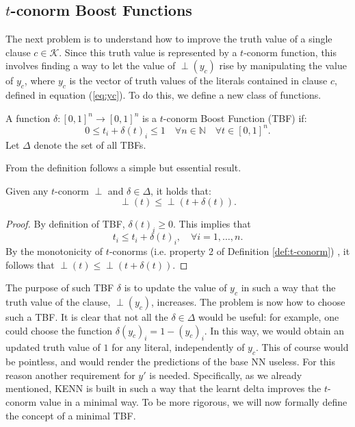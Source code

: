\subsection{$t$-conorm Boost Functions}
The next problem is to understand how to improve the truth value of a single clause \textcolor{unipd}{$c \in \mathcal{K}$}. Since this truth value is represented by a $t$-conorm function, \textcolor{unipd}{this involves finding a way to let the value of $\perp(y_c)$ rise by manipulating the value of $y_c$, where $y_c$ is the vector of truth values of the literals contained in clause $c$, defined in equation (\ref{eq:yc})}. To do this, we define a new class of functions.

\begin{definition}
	A function $\delta:[0,1]^{n} \rightarrow[0,1]^{n}$ is a $t$-conorm Boost Function (TBF) if:
	$$
	0 \leq t_{i}+\delta(t)_{i} \leq 1  \quad \forall n \in \mathbb{N} \quad \forall t \in[0,1]^{n}.
	$$
	Let $\Delta$ denote the set of all TBFs.
\end{definition}
From the definition follows a simple but essential result.

\begin{lemma}
	Given any $t$-conorm $\perp$ and $\delta \in \Delta$, it holds that:
	$$ \perp(t) \leq \perp(t + \delta(t)).$$
\end{lemma}
\begin{proof}
	By definition of TBF, $\delta(t)_i \geq 0$. This implies that $$t_i \leq t_i + \delta(t)_i, \quad \forall i=1,\dots,n.$$By the monotonicity of $t$-conorms (i.e. property 2 of Definition \ref{def:t-conorm})
	, it follows that $\perp(t) \leq \perp(t+\delta(t))$.
\end{proof}

\textcolor{unipd}{The purpose of such TBF $\delta$ is to update the value of $y_c$ in such a way that the truth value of the clause, $\perp\left(y_c\right)$, increases}. The problem is now how to choose such a TBF. It is clear that not all the $\delta \in \Delta$ would be useful: \textcolor{unipd}{for example, one could choose the function $\delta(y_c)_i = 1-(y_c)_i$}. In this way, we would obtain an updated truth value of $1$ for any literal, independently \textcolor{unipd}{of $y_c$}. This of course would be pointless, and would render the predictions of the base NN useless. For this reason another requirement for $y'$ is needed. Specifically, as we already mentioned, KENN is built in such a way that the learnt delta improves the $t$-conorm value in a minimal way. To be more rigorous, we will now formally define the concept of a minimal TBF.

